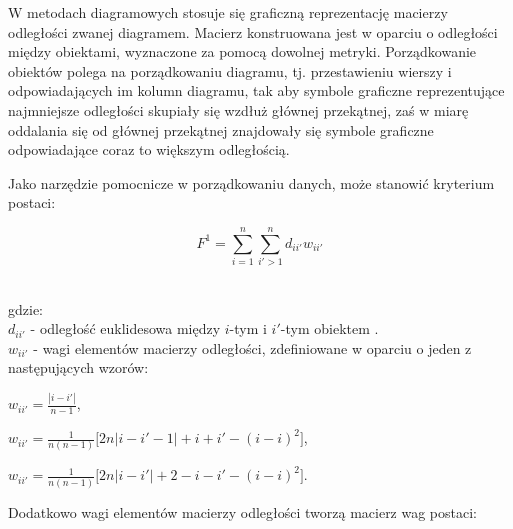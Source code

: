 \documentclass[12pt,a4paper]{report}
\begin{document}
W metodach diagramowych stosuje się graficzną reprezentację macierzy odległości zwanej diagramem. Macierz konstruowana jest w oparciu o odległości między obiektami, wyznaczone za pomocą dowolnej metryki. Porządkowanie obiektów polega na porządkowaniu diagramu, tj. przestawieniu wierszy i odpowiadających im kolumn diagramu, tak aby symbole graficzne reprezentujące najmniejsze odległości skupiały się wzdłuż głównej przekątnej, zaś w miarę oddalania się od głównej przekątnej znajdowały się symbole graficzne odpowiadające coraz to większym odległością.  %


Jako narzędzie pomocnicze w porządkowaniu danych, może stanowić kryterium postaci:

\begin{center}
$$F^1= \sum_{i=1}^{n} \sum_{i'>1}^{n} d_{ii'}w_{ii'}$$\\
\end{center}
gdzie:\\
 $d_{ii'}$ - odległość euklidesowa między $i$-tym i $i'$-tym obiektem . \\
 $w_{ii'}$ - wagi elementów macierzy odległości, zdefiniowane w oparciu o jeden z następujących wzorów: \\
 
 \begin{center}
 
 $ w_{ii'}=\frac{| i-i' |}{n-1}$, $\qquad$ \\
   \end{center}
   \begin{center}
 $ w_{ii'}=\frac{1}{n(n-1)}\lbrack{2n|i-i'-1|+i+i'-(i-i)^2\rbrack}$,\\
 \end{center}
 \begin{center}
 $ w_{ii'}=\frac{1}{n(n-1)}\lbrack{2n|i-i'|+2-i-i'-(i-i)^2\rbrack}$.\\
\end{center}

Dodatkowo wagi elementów macierzy odległości tworzą macierz wag postaci:
\end{document}
